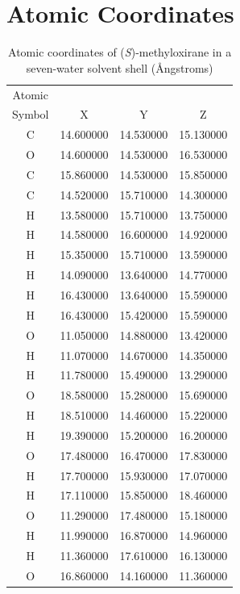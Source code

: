 \clearpage
\section{Atomic Coordinates}
\begin{table}[!ht]
    \centering
    \caption{Atomic coordinates of (\textit{S})-methyloxirane in a seven-water solvent shell
 (\AA ngstroms)}
    \label{metox_7}
    \begin{tabular}{ c c c c }
    \hline
    \hline
    Atomic & & & \\
    Symbol & X & Y & Z \\
    \hline
	C &  14.600000 &  14.530000 &  15.130000 \\
	O &  14.600000 &  14.530000 &  16.530000 \\
	C &  15.860000 &  14.530000 &  15.850000 \\
	C &  14.520000 &  15.710000 &  14.300000 \\
	H &  13.580000 &  15.710000 &  13.750000 \\
	H &  14.580000 &  16.600000 &  14.920000 \\
	H &  15.350000 &  15.710000 &  13.590000 \\
	H &  14.090000 &  13.640000 &  14.770000 \\
	H &  16.430000 &  13.640000 &  15.590000 \\
	H &  16.430000 &  15.420000 &  15.590000 \\
	O &  11.050000 &  14.880000 &  13.420000 \\
	H &  11.070000 &  14.670000 &  14.350000 \\
	H &  11.780000 &  15.490000 &  13.290000 \\
	O &  18.580000 &  15.280000 &  15.690000 \\
	H &  18.510000 &  14.460000 &  15.220000 \\
	H &  19.390000 &  15.200000 &  16.200000 \\
	O &  17.480000 &  16.470000 &  17.830000 \\
	H &  17.700000 &  15.930000 &  17.070000 \\
	H &  17.110000 &  15.850000 &  18.460000 \\
	O &  11.290000 &  17.480000 &  15.180000 \\
	H &  11.990000 &  16.870000 &  14.960000 \\
	H &  11.360000 &  17.610000 &  16.130000 \\
	O &  16.860000 &  14.160000 &  11.360000 \\

\end{tabular}
\end{table}
